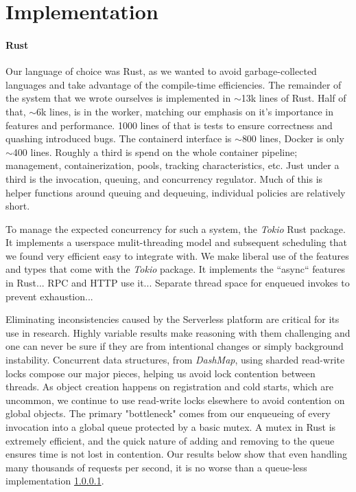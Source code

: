 \section{Implementation}


\paragraph{Rust}



Our language of choice was Rust, as we wanted to avoid garbage-collected languages and take advantage of the compile-time efficiencies.
The remainder of the system that we wrote ourselves is implemented in $\sim$13k lines of Rust.
Half of that, $\sim$6k lines, is in the worker, matching our emphasis on it's importance in features and performance.
1000 lines of that is tests to ensure correctness and quashing introduced bugs.
The containerd interface is $\sim$800 lines, Docker is only $\sim$400 lines.
Roughly a third is spend on the whole container pipeline; management, containerization, pools, tracking characteristics, etc.
Just under a third is the invocation, queuing, and concurrency regulator.
Much of this is helper functions around queuing and dequeuing, individual policies are relatively short.

To manage the expected concurrency for such a system, the \emph{Tokio} Rust package.
It implements a userspace mulit-threading model and subsequent scheduling that we found very efficient easy to integrate with.
We make liberal use of the features and types that come with the \emph{Tokio} package.
It implements the ``async`` features in Rust...
RPC and HTTP use it...
Separate thread space for enqueued invokes to prevent exhaustion...



Eliminating inconsistencies caused by the Serverless platform are critical for its use in research.
Highly variable results make reasoning with them challenging and one can never be sure if they are from intentional changes or simply background instability.
Concurrent data structures, from \emph{DashMap}, using sharded read-write locks compose our major pieces, helping us avoid lock contention between threads.
As object creation happens on registration and cold starts, which are uncommon, we continue to use read-write locks elsewhere to avoid contention on global objects.
The primary "bottleneck" comes from our enqueueing of every invocation into a global queue protected by a basic mutex.
A mutex in Rust is extremely efficient, and the quick nature of adding and removing to the queue ensures time is not lost in contention.
Our results below show that even handling many thousands of requests per second, it is no worse than a queue-less implementation \ref{}.

